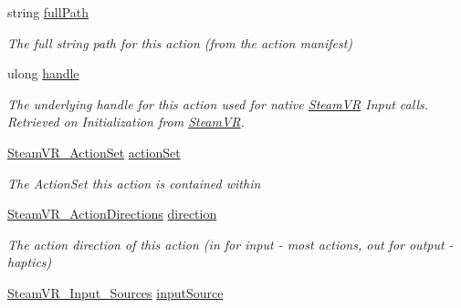 \begin{DoxyCompactItemize}
\item 
string \mbox{\hyperlink{class_valve_1_1_v_r_1_1_steam_v_r___action___source_acc5b9a83a017ceda67f3454bb6cefe25}{full\+Path}}
\begin{DoxyCompactList}\small\item\em The full string path for this action (from the action manifest) \end{DoxyCompactList}\item 
ulong \mbox{\hyperlink{class_valve_1_1_v_r_1_1_steam_v_r___action___source_a3b11b02fd911ae14ceac84478c5fe986}{handle}}
\begin{DoxyCompactList}\small\item\em The underlying handle for this action used for native \mbox{\hyperlink{class_valve_1_1_v_r_1_1_steam_v_r}{Steam\+VR}} Input calls. Retrieved on Initialization from \mbox{\hyperlink{class_valve_1_1_v_r_1_1_steam_v_r}{Steam\+VR}}. \end{DoxyCompactList}\item 
\mbox{\hyperlink{class_valve_1_1_v_r_1_1_steam_v_r___action_set}{Steam\+V\+R\+\_\+\+Action\+Set}} \mbox{\hyperlink{class_valve_1_1_v_r_1_1_steam_v_r___action___source_aa26748aead4336e028834777336636bb}{action\+Set}}
\begin{DoxyCompactList}\small\item\em The Action\+Set this action is contained within \end{DoxyCompactList}\item 
\mbox{\hyperlink{namespace_valve_1_1_v_r_a1e6192cb5ddaf204afab87ccb5728780}{Steam\+V\+R\+\_\+\+Action\+Directions}} \mbox{\hyperlink{class_valve_1_1_v_r_1_1_steam_v_r___action___source_a67903c42bb717287d4a1a4a0f972537a}{direction}}
\begin{DoxyCompactList}\small\item\em The action direction of this action (in for input -\/ most actions, out for output -\/ haptics) \end{DoxyCompactList}\item 
\mbox{\hyperlink{namespace_valve_1_1_v_r_a82e5bf501cc3aa155444ee3f0662853f}{Steam\+V\+R\+\_\+\+Input\+\_\+\+Sources}} \mbox{\hyperlink{class_valve_1_1_v_r_1_1_steam_v_r___action___source_a8610e78de0430e918d74119fe0913697}{input\+Source}}

\end{DoxyCompactItemize}
